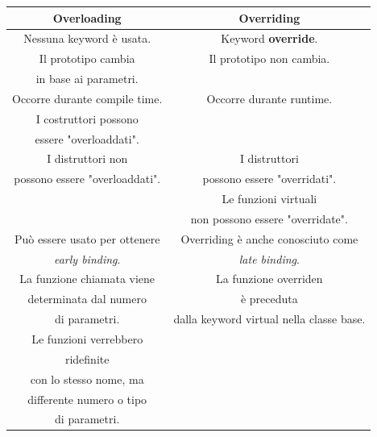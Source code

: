 \begin{tabular}{|c|c|} %
	\hline
	\textbf{Overloading} & \textbf{Overriding} \\
	\hline
	\textsf{\small Nessuna keyword è usata.} & \textsf{\small Keyword \textbf{override}.} \\
	\hline
	\textsf{\small Il prototipo cambia } & \textsf{\small Il prototipo non cambia.} \\
	\textsf{\small in base ai parametri.} & \textsf{\small } \\
	\hline
	\textsf{\small Occorre durante compile time.} & \textsf{\small Occorre durante runtime.} \\
	\hline
	\textsf{\small I costruttori possono } & \textsf{\small } \\
	\textsf{\small essere "overloaddati".} & \textsf{\small } \\
	\hline
	\textsf{\small I distruttori non } & \textsf{\small I distruttori } \\
	\textsf{\small possono essere "overloaddati".} & \textsf{\small possono essere "overridati".} \\
	\hline
	\textsf{\small } & \textsf{\small Le funzioni virtuali } \\
	\textsf{\small } & \textsf{\small non possono essere "overridate".} \\
	\hline
	\textsf{\small Può essere usato per ottenere } & \textsf{\small Overriding è anche conosciuto come } \\
	\textsf{\small \emph{early binding}.} & \textsf{\small \emph{late binding}.} \\
	\hline
	\textsf{\small La funzione chiamata viene } & \textsf{\small La funzione overriden} \\
	\textsf{\small determinata dal numero} & \textsf{\small è preceduta} \\
	\textsf{\small di parametri.} & \textsf{\small dalla keyword virtual nella classe base.} \\
	\hline
	\textsf{\small Le funzioni verrebbero} & \textsf{\small } \\
	\textsf{\small ridefinite} & \textsf{\small } \\
	\textsf{\small con lo stesso nome, ma} & \textsf{\small } \\
	\textsf{\small differente numero o tipo} & \textsf{\small } \\
	\textsf{\small di parametri.} & \textsf{\small } \\
	\hline

\end{tabular}
